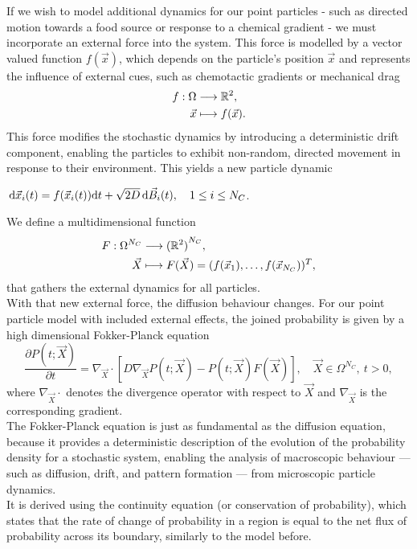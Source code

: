 If we wish to model additional dynamics for our point particles - such as directed motion towards a food source or response to a chemical gradient - we must incorporate an external force into the system. 
This force is modelled by a vector valued function $f(\vec{x})$, which depends on the particle's position $\vec{x}$ and represents the influence of external cues, such as chemotactic gradients or mechanical drag \\
\begin{align*}
	f : \Omega &\longrightarrow \mathbb{R}^2, \\
	\vec{x} &\longmapsto f(\vec{x}). 
\end{align*}
This force modifies the stochastic dynamics by introducing a deterministic drift component, enabling the particles to exhibit non-random, directed movement in response to their environment.
This yields a new particle dynamic 
\begin{center}
	$\, \mathrm{d} \vec{x}_i(t) = f(\vec{x}_i(t)) \mathrm{d} t + \sqrt{2D} \, \mathrm{d} \vec{B}_i(t), \quad 1 \leq i \leq N_C$. 
\end{center}
We define a multidimensional function
\begin{align*}
	F : \Omega^{N_C} &\longrightarrow {(\mathbb{R}^2)}^{N_C}, \\
	\vec{X} &\longmapsto F(\vec{X}) = (f(\vec{x}_1), \ldots, f(\vec{x}_{N_C}))^T,
\end{align*}
that gathers the external dynamics for all particles. \\
With that new external force, the diffusion behaviour changes. 
For our point particle model with included external effects, the joined probability is given by a high dimensional Fokker-Planck equation 
\[
	\dfrac{\partial P(t; \vec{X})}{\partial t} = \nabla_{\vec{X}} \cdot [D \nabla_{\vec{X}} P(t; \vec{X}) - P(t; \vec{X}) F(\vec{X})], \quad \vec{X} \in \Omega^{N_C}, \: t>0, 
\] 
where $\nabla_{\vec{X}} \cdot$ denotes the divergence operator with respect to $\vec{X}$ and $\nabla_{\vec{X}}$ is the corresponding gradient. \\
The Fokker-Planck equation is just as fundamental as the diffusion equation, because it provides a deterministic description of the evolution of the probability density for a stochastic system, enabling the analysis of macroscopic behaviour — such as diffusion, drift, and pattern formation — from microscopic particle dynamics. \\
It is derived using the continuity equation (or conservation of probability), which states that the rate of change of probability in a region is equal to the net flux of probability across its boundary, similarly to the model before. \\
